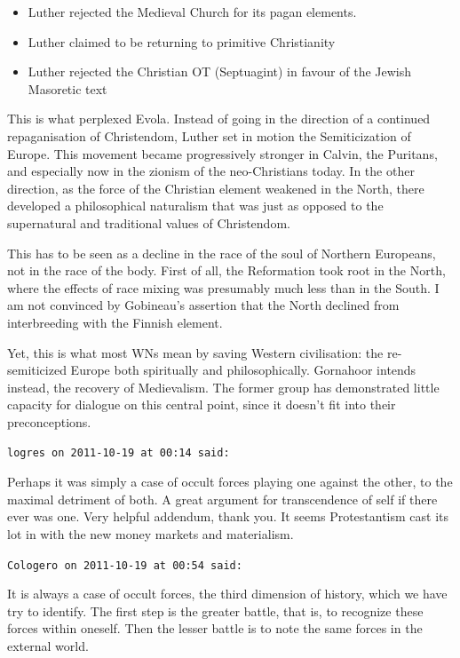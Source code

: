 \begin{footnotesize}
\begin{sffamily}
\begin{itemize}
\item Luther rejected the Medieval Church for its pagan elements.

\item Luther claimed to be returning to primitive Christianity

\item Luther rejected the Christian OT (Septuagint) in favour of the Jewish Masoretic text
\end{itemize}


This is what perplexed Evola. Instead of going in the direction of a continued repaganisation of Christendom, Luther set in motion the Semiticization of Europe. This movement became progressively stronger in Calvin, the Puritans, and especially now in the zionism of the neo-Christians today. In the other direction, as the force of the Christian element weakened in the North, there developed a philosophical naturalism that was just as opposed to the supernatural and traditional values of Christendom.

This has to be seen as a decline in the race of the soul of Northern Europeans, not in the race of the body. First of all, the Reformation took root in the North, where the effects of race mixing was presumably much less than in the South. I am not convinced by Gobineau's assertion that the North declined from interbreeding with the Finnish element.

Yet, this is what most WNs mean by saving Western civilisation: the re-semiticized Europe both spiritually and philosophically. Gornahoor intends instead, the recovery of Medievalism. The former group has demonstrated little capacity for dialogue on this central point, since it doesn't fit into their preconceptions.

\hfill

\texttt{logres on 2011-10-19 at 00:14 said:}

Perhaps it was simply a case of occult forces playing one against the other, to the maximal detriment of both. A great argument for transcendence of self if there ever was one. Very helpful addendum, thank you. It seems Protestantism cast its lot in with the new money markets and materialism.

\hfill

\texttt{Cologero on 2011-10-19 at 00:54 said:}

It is always a case of occult forces, the third dimension of history, which we have try to identify. The first step is the greater battle, that is, to recognize these forces within oneself. Then the lesser battle is to note the same forces in the external world.


\end{sffamily}
\end{footnotesize}
